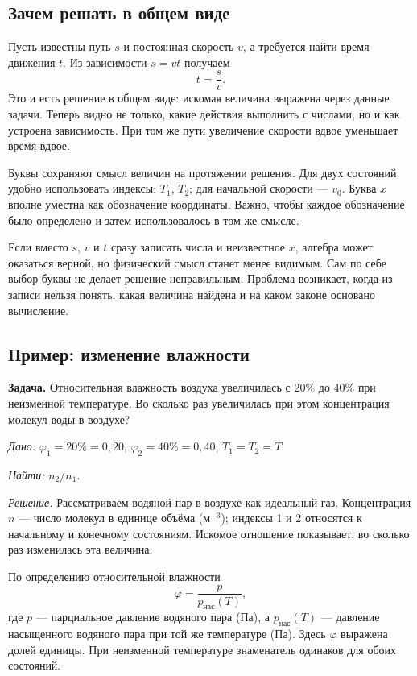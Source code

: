 \subsection{Зачем решать в общем виде}

Пусть известны путь $s$ и постоянная скорость $v$, а требуется найти
время движения $t$. Из зависимости $s=vt$ получаем
\[
t=\frac{s}{v}.
\]
Это и есть решение в общем виде: искомая величина выражена через
данные задачи. Теперь видно не только, какие действия выполнить
с числами, но и как устроена зависимость. При том же пути увеличение
скорости вдвое уменьшает время вдвое.

Буквы сохраняют смысл величин на протяжении решения.
Для двух состояний удобно использовать индексы: $T_1$, $T_2$;
для начальной скорости — $v_0$. Буква $x$ вполне уместна как
обозначение координаты. Важно, чтобы каждое обозначение было
определено и затем использовалось в том же смысле.

Если вместо $s$, $v$ и $t$ сразу записать числа и неизвестное $x$,
алгебра может оказаться верной, но физический смысл станет менее
видимым. Сам по себе выбор буквы не делает решение неправильным.
Проблема возникает, когда из записи нельзя понять, какая величина
найдена и на каком законе основано вычисление.

\newpage
\subsection{Пример: изменение влажности}

\textbf{Задача.} Относительная влажность воздуха увеличилась с 20\%
до 40\% при неизменной температуре. Во сколько раз увеличилась при этом
концентрация молекул воды в воздухе?

\medskip
\noindent\textit{Дано:}
$\varphi_1=20\%=0{,}20$, $\varphi_2=40\%=0{,}40$, $T_1=T_2=T$.

\noindent\textit{Найти:} $n_2/n_1$.

\medskip
\noindent\textit{Решение.} Рассматриваем водяной пар в воздухе как
идеальный газ. Концентрация $n$ — число молекул в единице объёма
(м$^{-3}$); индексы 1 и 2 относятся к начальному и конечному состояниям.
Искомое отношение показывает, во сколько раз изменилась эта величина.

По определению относительной влажности
\[
\varphi=\frac{p}{p_{\text{нас}}(T)},
\]
где $p$ — парциальное давление водяного пара (Па), а
$p_{\text{нас}}(T)$ — давление насыщенного водяного пара при той же
температуре (Па). Здесь $\varphi$ выражена долей единицы.
При неизменной температуре знаменатель одинаков для обоих состояний.

